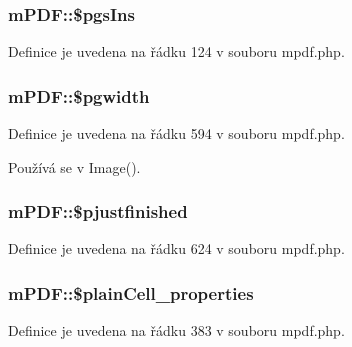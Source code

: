 \hypertarget{classm_p_d_f_a6338d4aac20f26f52165c831fe0f2334}{
\subsubsection[{\$pgs\-Ins}]{\setlength{\rightskip}{0pt plus 5cm}m\-P\-D\-F\-::\$pgs\-Ins}}\label{classm_p_d_f_a6338d4aac20f26f52165c831fe0f2334}


Definice je uvedena na řádku 124 v souboru mpdf.\-php.

\hypertarget{classm_p_d_f_a54dd5e4b7e26ecdc8789b710ba7f8fd4}{
\subsubsection[{\$pgwidth}]{\setlength{\rightskip}{0pt plus 5cm}m\-P\-D\-F\-::\$pgwidth}}\label{classm_p_d_f_a54dd5e4b7e26ecdc8789b710ba7f8fd4}


Definice je uvedena na řádku 594 v souboru mpdf.\-php.



Používá se v Image().

\hypertarget{classm_p_d_f_ab098af7f4df11b4a22d15a7cbf4f7aaf}{
\subsubsection[{\$pjustfinished}]{\setlength{\rightskip}{0pt plus 5cm}m\-P\-D\-F\-::\$pjustfinished}}\label{classm_p_d_f_ab098af7f4df11b4a22d15a7cbf4f7aaf}


Definice je uvedena na řádku 624 v souboru mpdf.\-php.

\hypertarget{classm_p_d_f_a5622f7ffc1f77cd4e0554a3d4a6df7d0}{
\subsubsection[{\$plain\-Cell\-\_\-properties}]{\setlength{\rightskip}{0pt plus 5cm}m\-P\-D\-F\-::\$plain\-Cell\-\_\-properties}}\label{classm_p_d_f_a5622f7ffc1f77cd4e0554a3d4a6df7d0}


Definice je uvedena na řádku 383 v souboru mpdf.\-php.


